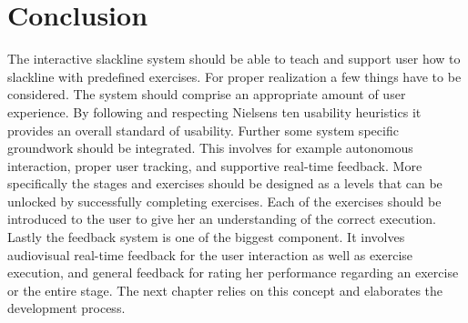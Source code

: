 \section{Conclusion}\label{4_7_conclusion}
The interactive slackline system should be able to teach and support user how to slackline with predefined exercises. For proper realization a few things have to be considered. The system should comprise an appropriate amount of user experience. By following and respecting Nielsens ten usability heuristics it provides an overall standard of usability. Further some system specific groundwork should be integrated. This involves for example autonomous interaction, proper user tracking, and supportive real-time feedback. More specifically the stages and exercises should be designed as a levels that can be unlocked by successfully completing exercises. Each of the exercises should be introduced to the user to give her an understanding of the correct execution. Lastly the feedback system is one of the biggest component. It involves audiovisual real-time feedback for the user interaction as well as exercise execution, and general feedback for rating her performance regarding an exercise or the entire stage. The next chapter \textit{} relies on this concept and elaborates the development process.
